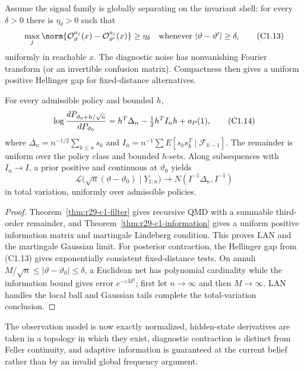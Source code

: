 Assume the signal family is globally separating on the invariant shell:
for every $\delta>0$ there is $\eta_\delta>0$ such that
\[
 \max_j\norm{\mathcal O^{a_j}_{\vartheta}(x)-
                   \mathcal O^{a_j}_{\vartheta'}(x)}
 \ge\eta_\delta
 \quad\text{whenever }|\vartheta-\vartheta'|\ge\delta,    \tag{C1.13}
\]
uniformly in reachable $x$.  The diagnostic noise has nonvanishing Fourier
transform (or an invertible confusion matrix).  Compactness then gives a
uniform positive Hellinger gap for fixed-distance alternatives.

\begin{theorem}
\label{thm:r29-c1-bvm}
For every admissible policy and bounded $h$,
\[
 \log{dP_{\vartheta_0+h/\sqrt n}\over dP_{\vartheta_0}}
 =h^T\Delta_n-\tfrac12h^TI_nh+o_{P}(1),                  \tag{C1.14}
\]
where
$\Delta_n=n^{-1/2}\sum_{k\le n}s_k$ and
$I_n=n^{-1}\sum E[s_ks_k^T\mid\mathcal F_{k-1}]$.
The remainder is uniform over the policy class and bounded $h$-sets.  Along
subsequences with $I_n\to I$, a prior positive and continuous at
$\vartheta_0$ yields
\[
 \mathcal L\bigl(\sqrt n(\vartheta-\vartheta_0)
       \mid Y_{1:n}\bigr)
 \longrightarrow N(I^{-1}\Delta_n,I^{-1})                \tag{C1.15}
\]
in total variation, uniformly over admissible policies.
\end{theorem}

\begin{proof}
Theorem~\ref{thm:r29-c1-filter} gives recursive QMD with a summable third-order
remainder, and Theorem~\ref{thm:r29-c1-information} gives a uniform positive
information matrix and martingale Lindeberg condition.  This proves LAN and
the martingale Gaussian limit.  For posterior contraction, the Hellinger gap
from (C1.13) gives exponentially consistent fixed-distance tests.  On annuli
$M/\sqrt n\le|\vartheta-\vartheta_0|\le\delta$, a Euclidean net has polynomial
cardinality while the information bound gives error $e^{-cM^2}$; first let
$n\to\infty$ and then $M\to\infty$.  LAN handles the local ball and Gaussian
tails complete the total-variation conclusion.
\end{proof}

The observation model is now exactly normalized, hidden-state derivatives are
taken in a topology in which they exist, diagnostic contraction is distinct
from Feller continuity, and adaptive information is guaranteed at the current
belief rather than by an invalid global frequency argument.
